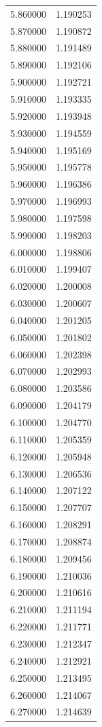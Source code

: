 \begin{tabular}{rr}
5.860000 & 1.190253 \\
5.870000 & 1.190872 \\
5.880000 & 1.191489 \\
5.890000 & 1.192106 \\
5.900000 & 1.192721 \\
5.910000 & 1.193335 \\
5.920000 & 1.193948 \\
5.930000 & 1.194559 \\
5.940000 & 1.195169 \\
5.950000 & 1.195778 \\
5.960000 & 1.196386 \\
5.970000 & 1.196993 \\
5.980000 & 1.197598 \\
5.990000 & 1.198203 \\
6.000000 & 1.198806 \\
6.010000 & 1.199407 \\
6.020000 & 1.200008 \\
6.030000 & 1.200607 \\
6.040000 & 1.201205 \\
6.050000 & 1.201802 \\
6.060000 & 1.202398 \\
6.070000 & 1.202993 \\
6.080000 & 1.203586 \\
6.090000 & 1.204179 \\
6.100000 & 1.204770 \\
6.110000 & 1.205359 \\
6.120000 & 1.205948 \\
6.130000 & 1.206536 \\
6.140000 & 1.207122 \\
6.150000 & 1.207707 \\
6.160000 & 1.208291 \\
6.170000 & 1.208874 \\
6.180000 & 1.209456 \\
6.190000 & 1.210036 \\
6.200000 & 1.210616 \\
6.210000 & 1.211194 \\
6.220000 & 1.211771 \\
6.230000 & 1.212347 \\
6.240000 & 1.212921 \\
6.250000 & 1.213495 \\
6.260000 & 1.214067 \\
6.270000 & 1.214639 \\

\end{tabular}
